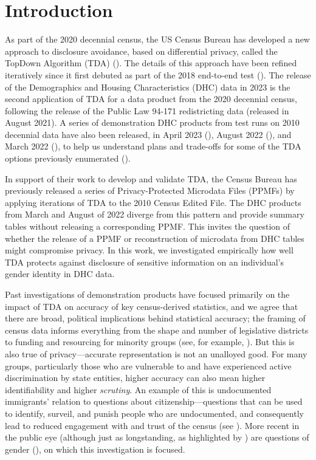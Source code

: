 \documentclass{jpc} %
\theoremstyle{plain}\newtheorem{satz}[thm]{Satz} %
\begin{document}
\section*{Introduction}\label{S:one}

As part of the 2020 decennial census, the US Census Bureau has developed a new approach to disclosure avoidance, based on differential privacy, called the TopDown Algorithm (TDA) (\cite{abowd2019census}).  The details of this approach have been refined iteratively since it first debuted as part of the 2018 end-to-end test (\cite{garfinkel2019end}).  The release of the Demographics and Housing Characteristics (DHC) data in 2023 is the second application of TDA for a data product from the 2020 decennial census, following the release of the Public Law 94-171 redistricting data (released in August 2021).  A series of  demonstration DHC products from test runs on 2010 decennial data have also been released, in April 2023 (\cite{census2023demonstration}), August 2022 (\cite{census2022bdemonstration}), and March 2022 (\cite{census2022demonstration}), to help us understand plans and trade-offs for some of the TDA options previously enumerated  (\cite{petti2019differential}).

In support of their work to develop and validate TDA,  the Census Bureau has previously released a series of Privacy-Protected Microdata Files (PPMFs) by applying iterations of TDA to the 2010 Census Edited File.  The DHC products from March and August of 2022 diverge from this pattern and provide summary tables without releasing a corresponding PPMF.  This invites the question of whether the release of a PPMF or reconstruction of microdata from DHC tables might compromise privacy.  In this work, we investigated empirically how well TDA protects against disclosure of sensitive information on an individual's gender identity in DHC data.

Past investigations of demonstration products have focused primarily on the impact of TDA on accuracy of key census-derived statistics,
and we agree that there are broad, political implications behind statistical accuracy; the framing of census data informs everything from the shape and number of legislative districts to funding and resourcing for minority groups (see, for example, \cite{thompson2012making}). But this is also true of privacy---accurate representation is not an unalloyed good. For many groups, particularly those who are vulnerable to and have experienced active discrimination by state entities, higher accuracy can also mean higher identifiability and higher \textit{scrutiny}. An example of this is undocumented immigrants' relation to questions about citizenship---questions that can be used to identify, surveil, and punish people who are undocumented, and consequently lead to reduced engagement with and trust of the census (see \cite{barreto2019}). More recent in the public eye (although just as longstanding, as highlighted by \cite{canaday2009straight}) are questions of gender (\cite{singer2015profusion}), on which this investigation is focused.
\end{document}
